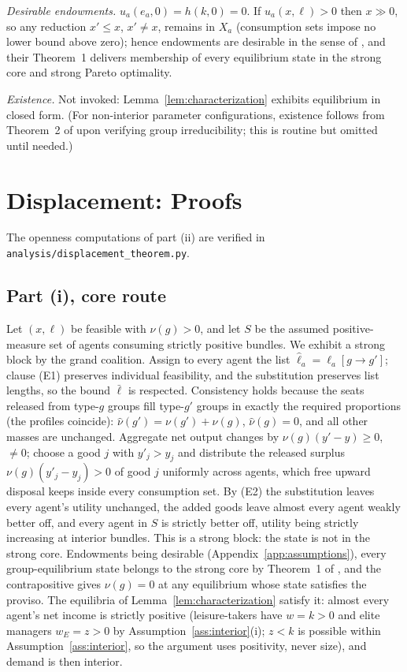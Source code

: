\documentclass[12pt,letterpaper]{article}
\theoremstyle{definition}
\begin{document}
\emph{Desirable endowments.}
$u_a(e_a,0) = h(k,0) = 0$.
If $u_a(x,\ell)>0$ then $x\gg 0$, so any reduction $x'\leq x$, $x'\neq x$, remains in $X_a$ (consumption sets impose no lower bound above zero); hence endowments are desirable in the sense of \citet[Section~9.4]{ellickson2006organization}, and their Theorem~1 delivers membership of every equilibrium state in the strong core and strong Pareto optimality.

\emph{Existence.}
Not invoked: Lemma~\ref{lem:characterization} exhibits equilibrium in closed form.
(For non-interior parameter configurations, existence follows from Theorem~2 of \citealt{ellickson2006organization} upon verifying group irreducibility; this is routine but omitted until needed.)

\section{Displacement: Proofs}\label{app:displacement}

The openness computations of part (ii) are verified in \texttt{analysis/displacement\_theorem.py}.

\subsection{Part (i), core route}
Let $(x,\ell)$ be feasible with $\nu(g)>0$, and let $S$ be the assumed positive-measure set of agents consuming strictly positive bundles.
We exhibit a strong block by the grand coalition.
Assign to every agent the list $\hat\ell_a=\ell_a[g\rightarrow g']$; clause (E1) preserves individual feasibility, and the substitution preserves list lengths, so the bound $\bar\ell$ is respected.
Consistency holds because the seats released from type-$g$ groups fill type-$g'$ groups in exactly the required proportions (the profiles coincide): $\hat\nu(g')=\nu(g')+\nu(g)$, $\hat\nu(g)=0$, and all other masses are unchanged.
Aggregate net output changes by $\nu(g)(y'-y)\geq 0$, $\neq 0$; choose a good $j$ with $y'_j>y_j$ and distribute the released surplus $\nu(g)(y'_j-y_j)>0$ of good $j$ uniformly across agents, which free upward disposal keeps inside every consumption set.
By (E2) the substitution leaves every agent's utility unchanged, the added goods leave almost every agent weakly better off, and every agent in $S$ is strictly better off, utility being strictly increasing at interior bundles.
This is a strong block: the state is not in the strong core.
Endowments being desirable (Appendix~\ref{app:assumptions}), every group-equilibrium state belongs to the strong core by Theorem~1 of \citet{ellickson2006organization}, and the contrapositive gives $\nu(g)=0$ at any equilibrium whose state satisfies the proviso.
The equilibria of Lemma~\ref{lem:characterization} satisfy it: almost every agent's net income is strictly positive (leisure-takers have $w=k>0$ and elite managers $w_E=z>0$ by Assumption~\ref{ass:interior}(i); $z<k$ is possible within Assumption~\ref{ass:interior}, so the argument uses positivity, never size), and demand is then interior.
\end{document}
